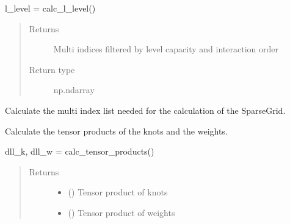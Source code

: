 \documentclass[letterpaper,10pt,english,openany,oneside]{sphinxmanual}
\begin{document}
\begin{fulllineitems}
\begin{fulllineitems}
l\_level = calc\_l\_level()
\begin{quote}\begin{description}
\item[{Returns}] \leavevmode
{} \textendash{} Multi indices filtered by level capacity and interaction order

\item[{Return type}] \leavevmode
np.ndarray

\end{description}\end{quote}

\end{fulllineitems}


\begin{fulllineitems}
\label{\detokenize{pygpc:pygpc.Grid.SparseGrid.calc_multi_indices}}
Calculate the multi index list needed for the calculation of the SparseGrid.

\end{fulllineitems}


\begin{fulllineitems}
\label{\detokenize{pygpc:pygpc.Grid.SparseGrid.calc_tensor_products}}
Calculate the tensor products of the knots and the weights.

dll\_k, dll\_w = calc\_tensor\_products()
\begin{quote}\begin{description}
\item[{Returns}] \leavevmode
\begin{itemize}
\item {} 
 () \textendash{} Tensor product of knots

\item {} 
 () \textendash{} Tensor product of weights

\end{itemize}


\end{description}\end{quote}

\end{fulllineitems}


\end{fulllineitems}
\end{document}
